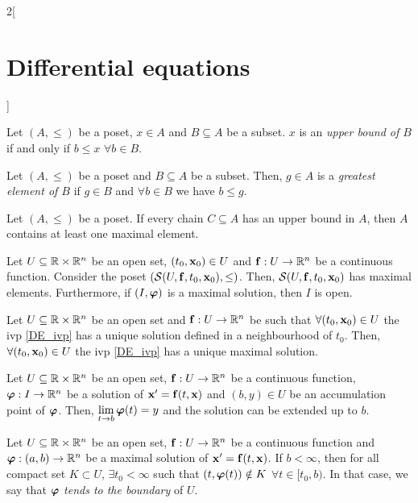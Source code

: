 \documentclass[../../../main.tex]{subfiles}
\begin{document}
\begin{multicols}{2}[\section{Differential equations}]
\begin{definition}
  \end{definition}
  \begin{definition}
    Let $(A,\leq )$ be a poset, $x\in A$ and $B\subseteq A$ be a subset. $x$ is an \textit{upper bound of $B$} if and only if $b\leq x$ $\forall b\in B$.
  \end{definition}
  \begin{definition}
    Let $(A,\leq )$ be a poset and $B\subseteq A$ be a subset. Then, $g\in A$ is a \textit{greatest element of $B$} if $g\in B$ and $\forall b\in B$ we have $b \leq  g$.
  \end{definition}
  \begin{lemma}
    Let $(A,\leq )$ be a poset. If every chain $C\subseteq A$ has an upper bound in $A$, then $A$ contains at least one maximal element.
  \end{lemma}
  \begin{theorem}
    Let $U\subseteq\mathbb{R}\times\mathbb{R}^n$ be an open set, $(t_0,\boldsymbol{\mathrm{x}}_0)\in U$ and $\boldsymbol{\mathrm{f}}:U\rightarrow\mathbb{R}^n$ be a continuous function. Consider the poset $(\mathcal{S}(U,\boldsymbol{\mathrm{f}},t_0,\boldsymbol{\mathrm{x}}_0),\leq)$. Then, $\mathcal{S}(U,\boldsymbol{\mathrm{f}},t_0,\boldsymbol{\mathrm{x}}_0)$ has maximal elements. Furthermore, if $(I,\boldsymbol{\mathrm{\varphi}})$ is a maximal solution, then $I$ is open.
  \end{theorem}
  \begin{prop}
    Let $U\subseteq\mathbb{R}\times\mathbb{R}^n$ be an open set and $\boldsymbol{\mathrm{f}}:U\rightarrow\mathbb{R}^n$ be such that $\forall(t_0,\boldsymbol{\mathrm{x}}_0)\in U$ the ivp \eqref{DE_ivp} has a unique solution defined in a neighbourhood of $t_0$. Then, $\forall(t_0,\boldsymbol{\mathrm{x}}_0)\in U$ the ivp \eqref{DE_ivp} has a unique maximal solution.
  \end{prop}
  \begin{lemma}
    Let $U\subseteq\mathbb{R}\times\mathbb{R}^n$ be an open set, $\boldsymbol{\mathrm{f}}:U\rightarrow\mathbb{R}^n$ be a continuous function, $\boldsymbol{\mathrm{\varphi}}:I\rightarrow\mathbb{R}^n$ be a solution of $\boldsymbol{\mathrm{x}}'=\boldsymbol{\mathrm{f}}(t,\boldsymbol{\mathrm{x}})$ and $(b,y)\in U$ be an accumulation point of $\boldsymbol{\mathrm{\varphi}}$. Then, $\displaystyle\lim_{t\to b}\boldsymbol{\mathrm{\varphi}}(t)=y$ and the solution can be extended up to $b$.
  \end{lemma}
  \begin{corollary}
    Let $U\subseteq\mathbb{R}\times\mathbb{R}^n$ be an open set, $\boldsymbol{\mathrm{f}}:U\rightarrow\mathbb{R}^n$ be a continuous function and $\boldsymbol{\mathrm{\varphi}}:(a,b)\rightarrow\mathbb{R}^n$ be a maximal solution of $\boldsymbol{\mathrm{x}}'=\boldsymbol{\mathrm{f}}(t,\boldsymbol{\mathrm{x}})$. If $b<\infty$, then for all compact set $K\subset U$, $\exists t_0<\infty$ such that $(t,\boldsymbol{\mathrm{\varphi}}(t))\notin K$ $\forall t\in[t_0,b)$. In that case, we say that $\boldsymbol{\mathrm{\varphi}}$ \textit{tends to the boundary} of $U$.
  \end{corollary}

\end{multicols}
\end{document}
